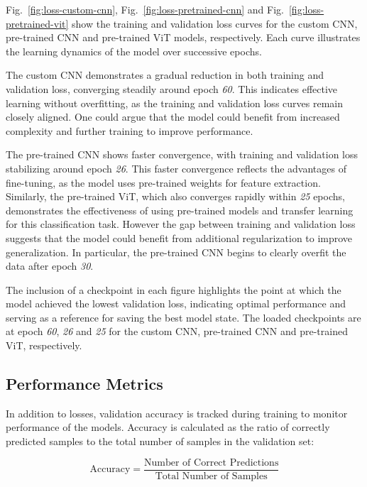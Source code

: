 Fig.~\ref{fig:loss-custom-cnn}, Fig.~\ref{fig:loss-pretrained-cnn} and Fig.~\ref{fig:loss-pretrained-vit} show the training and validation loss curves for the custom CNN, pre-trained CNN and pre-trained ViT models, respectively. Each curve illustrates the learning dynamics of the model over successive epochs.

The custom CNN demonstrates a gradual reduction in both training and validation loss, converging steadily around epoch \textit{60}. This indicates effective learning without overfitting, as the training and validation loss curves remain closely aligned. One could argue that the model could benefit from increased complexity and further training to improve performance.

The pre-trained CNN shows faster convergence, with training and validation loss stabilizing around epoch \textit{26}. This faster convergence reflects the advantages of fine-tuning, as the model uses pre-trained weights for feature extraction. Similarly, the pre-trained ViT, which also converges rapidly within \textit{25} epochs, demonstrates the effectiveness of using pre-trained models and transfer learning for this classification task. However the gap between training and validation loss suggests that the model could benefit from additional regularization to improve generalization. In particular, the pre-trained CNN begins to clearly overfit the data after epoch \textit{30}.

The inclusion of a checkpoint in each figure highlights the point at which the model achieved the lowest validation loss, indicating optimal performance and serving as a reference for saving the best model state. The loaded checkpoints are at epoch \textit{60}, \textit{26} and \textit{25} for the custom CNN, pre-trained CNN and pre-trained ViT, respectively.

\subsection{Performance Metrics}

In addition to losses, validation accuracy is tracked during training to monitor performance of the models. Accuracy is calculated as the ratio of correctly predicted samples to the total number of samples in the validation set:

\begin{equation}
    \text{Accuracy} = \frac{\text{Number of Correct Predictions}}{\text{Total Number of Samples}}\label{eq:accuracy}
\end{equation}

